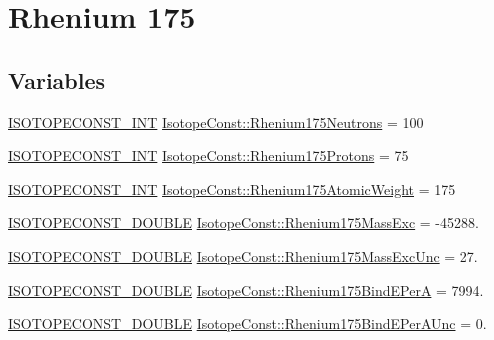 \hypertarget{group___isotope_const-_rhenium-_re175}{}\section{Rhenium 175}
\label{group___isotope_const-_rhenium-_re175}
\subsection*{Variables}
\begin{DoxyCompactItemize}
\item 
\mbox{\hyperlink{group___isotope_const-_macros_ga5f18360b3e99483a35c32d789e62621c}{I\+S\+O\+T\+O\+P\+E\+C\+O\+N\+S\+T\+\_\+\+I\+NT}} \mbox{\hyperlink{group___isotope_const-_rhenium-_re175_gac65909e80fe9fd475e62deb9941f454d}{Isotope\+Const\+::\+Rhenium175\+Neutrons}} = 100
\item 
\mbox{\hyperlink{group___isotope_const-_macros_ga5f18360b3e99483a35c32d789e62621c}{I\+S\+O\+T\+O\+P\+E\+C\+O\+N\+S\+T\+\_\+\+I\+NT}} \mbox{\hyperlink{group___isotope_const-_rhenium-_re175_gab89c4481870a624871a5bb51f42f4676}{Isotope\+Const\+::\+Rhenium175\+Protons}} = 75
\item 
\mbox{\hyperlink{group___isotope_const-_macros_ga5f18360b3e99483a35c32d789e62621c}{I\+S\+O\+T\+O\+P\+E\+C\+O\+N\+S\+T\+\_\+\+I\+NT}} \mbox{\hyperlink{group___isotope_const-_rhenium-_re175_ga778d0eab1952bf3591f0f083b55f42e2}{Isotope\+Const\+::\+Rhenium175\+Atomic\+Weight}} = 175
\item 
\mbox{\hyperlink{group___isotope_const-_macros_ga8f45a7272ce02c0b4c65c44636ed719a}{I\+S\+O\+T\+O\+P\+E\+C\+O\+N\+S\+T\+\_\+\+D\+O\+U\+B\+LE}} \mbox{\hyperlink{group___isotope_const-_rhenium-_re175_ga3545ff5ef4547ca857f5072473ed550e}{Isotope\+Const\+::\+Rhenium175\+Mass\+Exc}} = -\/45288.
\item 
\mbox{\hyperlink{group___isotope_const-_macros_ga8f45a7272ce02c0b4c65c44636ed719a}{I\+S\+O\+T\+O\+P\+E\+C\+O\+N\+S\+T\+\_\+\+D\+O\+U\+B\+LE}} \mbox{\hyperlink{group___isotope_const-_rhenium-_re175_gae721726e4d34a167f693e2012cf052cf}{Isotope\+Const\+::\+Rhenium175\+Mass\+Exc\+Unc}} = 27.
\item 
\mbox{\hyperlink{group___isotope_const-_macros_ga8f45a7272ce02c0b4c65c44636ed719a}{I\+S\+O\+T\+O\+P\+E\+C\+O\+N\+S\+T\+\_\+\+D\+O\+U\+B\+LE}} \mbox{\hyperlink{group___isotope_const-_rhenium-_re175_ga34dd514705f2589b36005acf2386adf0}{Isotope\+Const\+::\+Rhenium175\+Bind\+E\+PerA}} = 7994.
\item 
\mbox{\hyperlink{group___isotope_const-_macros_ga8f45a7272ce02c0b4c65c44636ed719a}{I\+S\+O\+T\+O\+P\+E\+C\+O\+N\+S\+T\+\_\+\+D\+O\+U\+B\+LE}} \mbox{\hyperlink{group___isotope_const-_rhenium-_re175_ga42231e56b19f4240d85540f856aa8313}{Isotope\+Const\+::\+Rhenium175\+Bind\+E\+Per\+A\+Unc}} = 0.

\end{DoxyCompactItemize}
